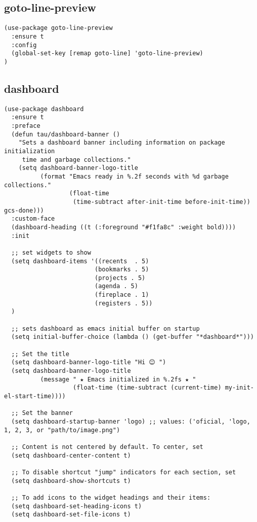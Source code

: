 \documentclass[11pt]{article}
\begin{document}
\subsection*{goto-line-preview}
\label{sec:orgbcf1969}

\begin{verbatim}
(use-package goto-line-preview
  :ensure t
  :config
  (global-set-key [remap goto-line] 'goto-line-preview)
)
\end{verbatim}

\subsection*{dashboard}
\label{sec:org3f70116}

\begin{verbatim}
(use-package dashboard
  :ensure t
  :preface
  (defun tau/dashboard-banner ()
    "Sets a dashboard banner including information on package initialization
     time and garbage collections."
    (setq dashboard-banner-logo-title
          (format "Emacs ready in %.2f seconds with %d garbage collections."
                  (float-time
                   (time-subtract after-init-time before-init-time)) gcs-done)))
  :custom-face
  (dashboard-heading ((t (:foreground "#f1fa8c" :weight bold))))
  :init

  ;; set widgets to show
  (setq dashboard-items '((recents  . 5)
                         (bookmarks . 5)
                         (projects . 5)
                         (agenda . 5)
                         (fireplace . 1)
                         (registers . 5))
  )

  ;; sets dashboard as emacs initial buffer on startup
  (setq initial-buffer-choice (lambda () (get-buffer "*dashboard*")))

  ;; Set the title
  (setq dashboard-banner-logo-title "Hi 😊 ")
  (setq dashboard-banner-logo-title
          (message " ★ Emacs initialized in %.2fs ★ "
                   (float-time (time-subtract (current-time) my-init-el-start-time))))

  ;; Set the banner
  (setq dashboard-startup-banner 'logo) ;; values: ('oficial, 'logo, 1, 2, 3, or "path/to/image.png")

  ;; Content is not centered by default. To center, set
  (setq dashboard-center-content t)

  ;; To disable shortcut "jump" indicators for each section, set
  (setq dashboard-show-shortcuts t)

  ;; To add icons to the widget headings and their items:
  (setq dashboard-set-heading-icons t)
  (setq dashboard-set-file-icons t)


\end{verbatim}
\end{document}
